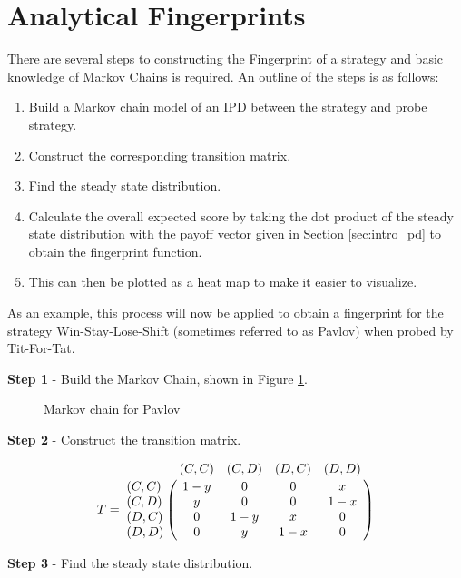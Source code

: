 \section{Analytical Fingerprints}\label{sec:analytical-fingerprints}

There are several steps to constructing the Fingerprint of a strategy and basic knowledge of Markov Chains is required.
An outline of the steps is as follows:

\begin{enumerate}
    \item Build a Markov chain model of an IPD between the strategy and probe strategy.
    \item Construct the corresponding transition matrix.
    \item Find the steady state distribution.
    \item Calculate the overall expected score by taking the dot product of the steady state distribution with the payoff vector given in Section \ref{sec:intro_pd} to obtain the fingerprint function.
    \item This can then be plotted as a heat map to make it easier to visualize.
\end{enumerate}

As an example, this process will now be applied to obtain a fingerprint for the strategy Win-Stay-Lose-Shift (sometimes referred to as Pavlov) when probed by Tit-For-Tat.

\textbf{Step 1} - Build the Markov Chain, shown in Figure \ref{fig:PavlovMC}.

\begin{figure}[ht!]
\centering

\caption{Markov chain for Pavlov}
\label{fig:PavlovMC}
\end{figure}

\textbf{Step 2} - Construct the transition matrix.

\begin{equation}\label{eq:transition_matrix}
%
T = \bordermatrix{~      & (C, C) & (C, D) & (D, C) & (D, D) \cr
                  (C, C) & 1 - y  & 0      & 0      & x      \cr
                  (C, D) & y      & 0      & 0      & 1 - x  \cr
                  (D, C) & 0      & 1 - y  & x      & 0      \cr
                  (D, D) & 0      & y      & 1 - x  & 0}
%
\end{equation}

\textbf{Step 3} - Find the steady state distribution.

